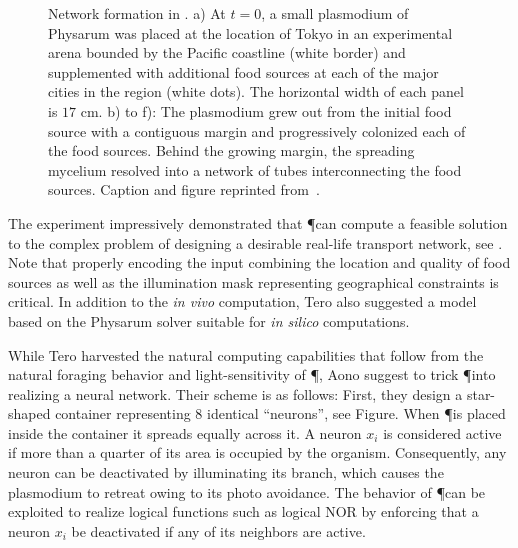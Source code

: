 			\begin{figure}
				\centering
				\newline
				
				
				\caption[Tokyo railway experiment]{Network formation in \Pp. a) At $t = 0$, a small plasmodium of Physarum was placed at the location of Tokyo in an experimental arena bounded by the Pacific coastline (white border) and supplemented with additional food sources at each of the major cities in the region (white dots). The horizontal width of each panel is $17$ cm. b) to f): The plasmodium grew out from the initial food source with a contiguous margin and progressively colonized each of the food sources. Behind the growing margin, the spreading mycelium resolved into a network of tubes interconnecting the food sources. Caption and figure reprinted from~\cite{Tero439}.}
				\label{fig:tokyo}
			\end{figure}

			The experiment impressively demonstrated that \P can compute a feasible solution to the complex problem of designing a desirable real-life transport network, see . Note that properly encoding the input combining the location and quality of food sources as well as the illumination mask representing geographical constraints is critical. In addition to the \textit{in vivo} computation, Tero \etal also suggested a model based on the Physarum solver suitable for \textit{in silico} computations.

			While Tero \etal harvested the natural computing capabilities that follow from the natural foraging behavior and light-sensitivity of \P, Aono \etal suggest to trick \P into realizing a neural network. Their scheme is as follows: First, they design a star-shaped container representing $8$ identical ``neurons'', see Figure.  When \P is placed inside the container it spreads equally across it. A neuron $x_i$ is considered active if more than a quarter of its area is occupied by the organism. Consequently, any neuron can be deactivated by illuminating its branch, which causes the plasmodium to retreat owing to its photo avoidance. The behavior of \P can be exploited to realize logical functions such as logical NOR by enforcing that a neuron $x_i$ be deactivated if any of its neighbors are active. 


